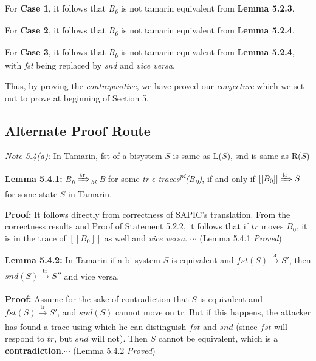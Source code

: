 \documentclass[11pt]{article}
\begin{document}
For {\bf Case 1}, it follows that {\it B\textsubscript{0}} is not tamarin equivalent from {\bf Lemma 5.2.3}.\newline

For {\bf Case 2}, it follows that {\it B\textsubscript{0}} is not tamarin equivalent from {\bf Lemma 5.2.4}.\newline

For {\bf Case 3}, it follows that {\it B\textsubscript{0}} is not tamarin equivalent from {\bf Lemma 5.2.4}, with {\it fst} being replaced by {\it snd} and {\it vice versa}.\newline

Thus, by proving the {\it contrapositive}, we have proved our {\it conjecture} which we set out to prove at beginning of Section 5.

\pagebreak
\subsection{Alternate Proof Route} 
{\it Note 5.4(a): }In Tamarin, fst of a bisystem $S$ is same as L($S$), snd is same as R($S$)\newline

{\bf Lemma 5.4.1: }{\it B\textsubscript{0} {$\xRightarrow[\text{}]{\text{tr}}$}\textsubscript{bi} B} for some {\it tr $\epsilon$ traces\textsuperscript{pi}(B\textsubscript{0})}, if and only if $[[B_0]]\xRightarrow[\text{}]{\text{tr}}S$ for some state $S$ in Tamarin.\newline

{\bf Proof: }It follows directly from correctness of SAPIC's translation. From the correctness results and Proof of Statement 5.2.2, it follows that if $tr$ moves $B_0$, it is in the trace of $[[B_0]]$ as well and {\it vice versa}. \hfill \hfill $\cdots$ (Lemma 5.4.1 {\it Proved}) \newline

{\bf Lemma 5.4.2: }In Tamarin if a bi system $S$ is equivalent and $fst(S) \xrightarrow[\text{}]{\text{tr}} S'$, then $snd(S) \xrightarrow[\text{}]{\text{tr}} S''$ and vice versa.\newline

{\bf Proof: }Assume for the sake of contradiction that $S$ is equivalent and $fst(S) \xrightarrow[\text{}]{\text{tr}} S'$, and $snd(S)$ cannot move on tr. But if this happens, the attacker has found a trace using which he can distinguish $fst$ and $snd$ (since $fst$ will respond to $tr$, but $snd$ will not). Then $S$ cannot be equivalent, which is a {\bf contradiction}.\hfill \hfill $\cdots$ (Lemma 5.4.2 {\it Proved})\newline 
\end{document}
